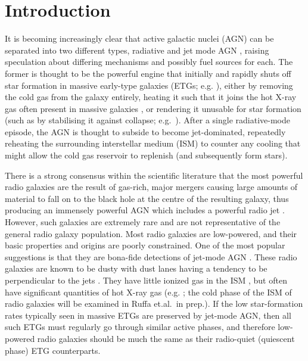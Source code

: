 \documentclass[a4paper,fleqn,usenatbib]{mnras}
\begin{document}



\section{Introduction}
	\label{sec:intro}
	It is becoming increasingly clear that active galactic nuclei (AGN) can be separated into two different types, radiative and jet mode AGN \citep[e.g.][]{Antonucci2012, Heckman2014}, raising speculation about differing mechanisms and possibly fuel sources for each. The former is thought to be the powerful engine that initially and rapidly shuts off star formation in massive early-type galaxies (ETGs; e.g. \citealt{Thomas2005, Thomas2010}), either by removing the cold gas from the galaxy entirely, heating it such that it joins the hot X-ray gas often present in massive galaxies \citep[e.g.][]{OSullivan2001}, or rendering it unusable for star formation (such as by stabilising it against collapse; e.g.\ \citealt{Martig2009}). After a single radiative-mode episode, the AGN is thought to subside to become jet-dominated, repeatedly reheating the surrounding interstellar medium (ISM) to counter any cooling that might allow the cold gas reservoir to replenish (and subsequently form stars). 

	There is a strong consensus within the scientific literature that the most powerful radio galaxies are the result of gas-rich, major mergers causing large amounts of material to fall on to the black hole at the centre of the resulting galaxy, thus producing an immensely powerful AGN which includes a powerful radio jet \citep[e.g.][]{Malin1983, Quillen1992, Lim2000}. However, such galaxies are extremely rare and are not representative of the general radio galaxy population. Most radio galaxies are low-powered, and their basic properties and origins are poorly constrained. One of the most popular suggestions is that they are bona-fide detections of jet-mode AGN \citep[e.g.][]{Heckman2014}.%
	These radio galaxies are known to be dusty with dust lanes having a tendency to be perpendicular to the jets \citep[e.g.][]{DeRuiter2002, VerdoesKleijn2005}. They have little ionized gas in the ISM \citep[e.g.][]{Sarzi2005}, but often have significant quantities of hot X-ray gas (e.g. \citealt{Canizares1987}; the cold phase of the ISM of radio galaxies will be examined in Ruffa et.al.\ in prep.). If the low star-formation rates typically seen in massive ETGs are preserved by jet-mode AGN, then all such ETGs must regularly go through similar active phases, and therefore low-powered radio galaxies should be much the same as their radio-quiet (quiescent phase) ETG counterparts. 
\end{document}

